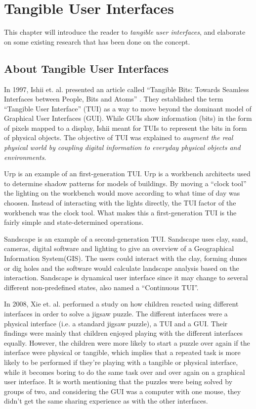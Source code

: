 \chapter{Tangible User Interfaces}
\label{chp:tangibleinterfaces}

This chapter will introduce the reader to \emph{tangible user interfaces}, and elaborate on some existing research that has been done on the concept.   

\section{About Tangible User Interfaces}
\label{sec:abouttuis}

In 1997, Ishii et. al. presented an article called ``Tangible Bits: Towards Seamless Interfaces between People, Bits and Atoms'' \cite{ishii1997tangible}. They established the term ``Tangible User Interface'' (TUI) as a way to move beyond the dominant model of Graphical User Interfaces (GUI). 
While GUIs show information (bits) in the form of pixels mapped to a display, Ishii meant for TUIs to represent the bits in form of physical objects. The objective of TUI was explained to \emph{augment the real physical world by coupling digital information to everyday physical objects and environments}\cite{ishii1997tangible}. 

Urp\cite{underkoffler1999urp} is an example of an first-generation TUI. Urp is a workbench architects used to determine shadow patterns for models of buildings. By moving a ``clock tool'' the lighting on the workbench would move according to what time of day was choosen. Instead of interacting with the lights directly, the TUI factor of the workbench was the clock tool.
What makes this a first-generation TUI is the fairly simple and state-determined operations.

Sandscape\cite{ishii2004bringing} is an example of a second-generation TUI. Sandscape uses clay, sand, cameras, digital software and lighting to give an overview of a Geographical Information System(GIS). The users could interact with the clay, forming dunes or dig holes and the software would calculate landscape analysis based on the interaction. Sandscape is dynamical user interface since it may change to several different non-predefined states, also named a ``Continuous TUI''.

In 2008, Xie et. al. performed a study on how children reacted using different interfaces in order to solve a jigsaw puzzle\cite{xie2008tangibles}. The different interfaces were a physical interface (i.e. a standard jigsaw puzzle), a TUI and a GUI. Their findings were mainly that children enjoyed playing with the different interfaces equally. However, the children were more likely to start a puzzle over again if the interface were physical or tangible, which implies that a repeated task is more likely to be performed if they're playing with a tangible or physical interface, while it becomes boring to do the same task over and over again on a graphical user interface. It is worth mentioning that the puzzles were being solved by groups of two, and considering the GUI was a computer with one mouse, they didn't get the same sharing experience as with the other interfaces. 


